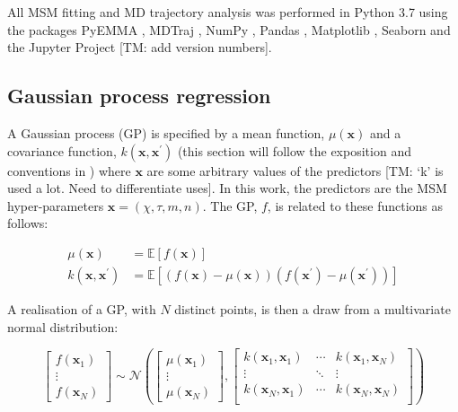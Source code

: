 All MSM fitting and MD trajectory analysis was performed in Python 3.7 using the packages PyEMMA \cite{schererPyEMMASoftwarePackage2015a}, MDTraj \cite{mcgibbonMDTrajModernOpen2015}, NumPy \cite{waltNumPyArrayStructure2011}, Pandas \cite{mckinneyPandasFoundationalPython2011}, Matplotlib \cite{hunterMatplotlib2DGraphics2007},  Seaborn \cite{michaelwaskomMwaskomSeabornV02020} and the Jupyter Project \cite{kluyverJupyterNotebooksPublishing2016} [TM: add version numbers].

\subsection{Gaussian process regression}\label{subsec:gp}

A Gaussian process (GP) is specified by a mean function, $\mu(\mathbf{x})$ and a covariance function, $k(\mathbf{x}, \mathbf{x}^{\prime})$ (this section will follow the exposition and conventions in \cite{rasmussenGaussianProcessesMachine2006}) where $\mathbf{x}$ are some arbitrary values of the predictors [TM: `k' is used a lot. Need to differentiate uses]. In this work, the predictors are the MSM hyper-parameters $\mathbf{x} = (\chi, \tau, m, n)$. The GP, $f$, is related to these functions as follows: 

\begin{equation}
    \begin{aligned}
    \mu\left(\mathbf{x}\right) &=\mathbb{E}\left[f\left(\mathbf{x}\right)\right] \\
    k\left(\mathbf{x}, \mathbf{x}^{\prime}\right) &=\mathbb{E}\left[(f(\mathbf{x})-\mu(\mathbf{x}))\left(f\left(\mathbf{x}^{\prime}\right)-\mu\left(\mathbf{x}^{\prime}\right)\right)\right]
    \end{aligned}
\end{equation}

A realisation of a GP, with $N$ distinct points, is then a draw from a multivariate normal distribution: 

\begin{equation}
\begin{bmatrix}  f\left(\mathbf{x}_{1}\right) \\ \vdots \\ f\left(\mathbf{x}_{N}\right) \end{bmatrix} 
\sim 
\mathcal{N}\left( 
\begin{bmatrix} \mu\left(\mathbf{x}_{1}\right) \\  \vdots \\ \mu\left(\mathbf{x}_{N}\right) \end{bmatrix}, 
\begin{bmatrix}
k(\mathbf{x}_{1}, \mathbf{x}_{1}) & \cdots & k(\mathbf{x}_{1}, \mathbf{x}_{N}) \\
\vdots & \ddots & \vdots \\
k(\mathbf{x}_{N}, \mathbf{x}_{1}) & \cdots & k(\mathbf{x}_{N}, \mathbf{x}_{N}) \\
\end{bmatrix}
\right)
\end{equation}

